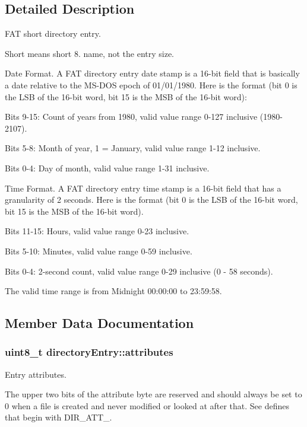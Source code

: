 \subsection{Detailed Description}
F\+AT short directory entry. 

Short means short 8. name, not the entry size.

Date Format. A F\+AT directory entry date stamp is a 16-\/bit field that is basically a date relative to the M\+S-\/\+D\+OS epoch of 01/01/1980. Here is the format (bit 0 is the L\+SB of the 16-\/bit word, bit 15 is the M\+SB of the 16-\/bit word)\+:

Bits 9-\/15\+: Count of years from 1980, valid value range 0-\/127 inclusive (1980-\/2107).

Bits 5-\/8\+: Month of year, 1 = January, valid value range 1-\/12 inclusive.

Bits 0-\/4\+: Day of month, valid value range 1-\/31 inclusive.

Time Format. A F\+AT directory entry time stamp is a 16-\/bit field that has a granularity of 2 seconds. Here is the format (bit 0 is the L\+SB of the 16-\/bit word, bit 15 is the M\+SB of the 16-\/bit word).

Bits 11-\/15\+: Hours, valid value range 0-\/23 inclusive.

Bits 5-\/10\+: Minutes, valid value range 0-\/59 inclusive.

Bits 0-\/4\+: 2-\/second count, valid value range 0-\/29 inclusive (0 -\/ 58 seconds).

The valid time range is from Midnight 00\+:00\+:00 to 23\+:59\+:58. 

\subsection{Member Data Documentation}
\subsubsection[{\texorpdfstring{attributes}{attributes}}]{\setlength{\rightskip}{0pt plus 5cm}uint8\+\_\+t directory\+Entry\+::attributes}\hypertarget{structdirectory_entry_a16c6cde55c8175c90935c386f1cfb21a}{}\label{structdirectory_entry_a16c6cde55c8175c90935c386f1cfb21a}
Entry attributes.

The upper two bits of the attribute byte are reserved and should always be set to 0 when a file is created and never modified or looked at after that. See defines that begin with D\+I\+R\+\_\+\+A\+T\+T\+\_\+. 
